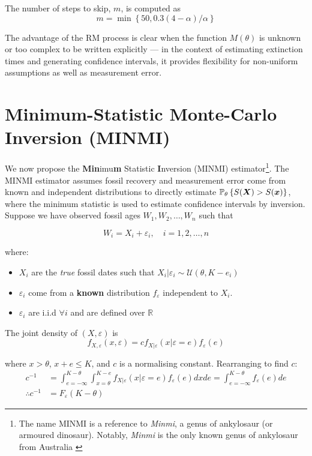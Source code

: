 The number of steps to skip, $m$, is computed as \[
m = \min \left\{ 50, 0.3(4-\alpha)/\alpha \right\}
\]

The advantage of the RM process is clear when the function $M(\theta)$ is unknown or too complex to be written explicitly --- in the context of estimating extinction times and generating confidence intervals, it provides flexibility for non-uniform assumptions as well as measurement error.

\section{Minimum-Statistic Monte-Carlo Inversion (MINMI)}\label{new-method}

We now propose the \textbf{Min}imu\textbf{m} Statistic \textbf{I}nversion (MINMI) estimator\footnote{The name MINMI is a reference to \textit{Minmi}, a genus of ankylosaur (or armoured dinosaur). Notably, \textit{Minmi} is the only known genus of ankylosaur from Australia \parencite{Carpenter2001}}. The MINMI estimator assumes fossil recovery and measurement error come from known and independent distributions to directly estimate $\mathbb{P}_\theta\left\{S(\bm{X}) > S(\bm{x})\right\}$, where the minimum statistic is used to estimate confidence intervals by inversion. Suppose we have observed fossil ages $W_1, W_2, \dots, W_n$ such that

\[
W_i = X_i + \varepsilon_i, \quad i = 1, 2, \dots, n
\]

where:
\begin{itemize}
    \item $X_i$ are the \textit{true} fossil dates such that $X_i | \varepsilon_i \sim \mathcal{U}(\theta, K - e_i) $
    \item $\varepsilon_i$ come from a \textbf{known} distribution $f_{\varepsilon}$ independent to $X_i$.
    \item $\varepsilon_i$ are i.i.d $\forall i$ and are defined over $\mathbb{R}$
\end{itemize}

The joint density of $(X, \varepsilon)$ is \[ f_{X, \varepsilon} ( x , \varepsilon) = c f_{X | \varepsilon} ( x | \varepsilon=e) f_\varepsilon(e) \]

where $x > \theta$, $x+e \leq K$, and $c$ is a normalising constant. Rearranging to find $c$:
\begin{align*}
    c^{-1}
        &= \int_{e=-\infty}^{K-\theta} \int_{x=\theta}^{K-e} f_{X | \varepsilon} ( x | \varepsilon=e) f_\varepsilon(e) dx de = \int_{e=-\infty}^{K-\theta} f_\varepsilon(e) de \\
    \therefore c^{-1} &= F_\varepsilon(K - \theta)
\end{align*}

